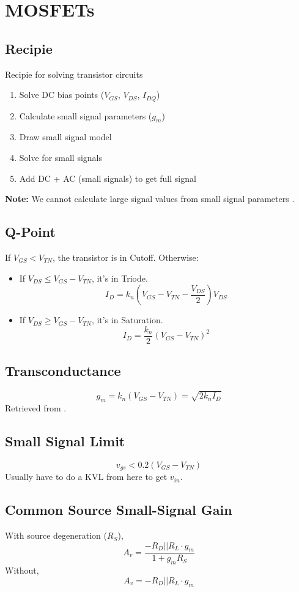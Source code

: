
\section{MOSFETs}
\subsection{Recipie}
Recipie for solving transistor circuits
\begin{enumerate}
	\item Solve DC bias points ($V_{GS}$, $V_{DS}$, $I_{DQ}$)
	\item Calculate small signal parameters ($g_m$)
	\item Draw small signal model
	\item Solve for small signals
	\item Add DC + AC (small signals) to get full signal
\end{enumerate}
\textbf{Note:} We cannot calculate large signal values from small signal parameters \cite{ulaby}.

\subsection{Q-Point}
If $V_{GS} < V_{TN}$, the transistor is in Cutoff. Otherwise:
\begin{itemize}
	\item If $V_{DS} \leq V_{GS}-V_{TN}$, it's in Triode.
	\[I_{D}=k_n\left(V_{GS}-V_{TN}-\frac{V_{DS}}{2}\right)V_{DS}\]
	\item If $V_{DS} \geq V_{GS}-V_{TN}$, it's in Saturation.
	\[I_{D}=\frac{k_n}{2}\left(V_{GS}-V_{TN}\right)^2\]
\end{itemize}

\subsection{Transconductance}
\begin{equation}
g_m = k_n\left(V_{GS}-V_{TN}\right) = \sqrt{2k_n I_{D}} \label{eq:dis}
\end{equation}
Retrieved from .


\subsection{Small Signal Limit}
\[v_{gs}<0.2\left(V_{GS}-V_{TN}\right)\]
Usually have to do a KVL from here to get $v_{in}$.


\subsection{Common Source Small-Signal Gain}
	With source degeneration ($R_S$),
	\[A_v=\frac{-R_D||R_L \cdot g_m}{1+g_m R_S}\]
	Without,
	\[A_v=-R_D||R_L\cdot g_m\]

